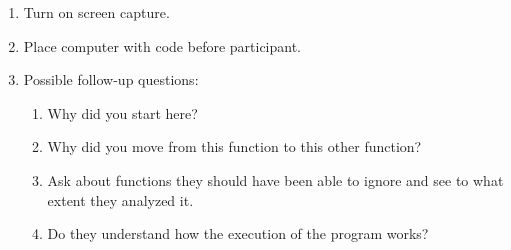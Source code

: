 \documentclass{article}
\begin{document}
\begin{enumerate}
\begin{enumerate}
    \item Turn on screen capture.
    \item Place computer with code before participant.
    \item Possible follow-up questions:
     \begin{enumerate}
      \item Why did you start here?
      \item Why did you move from this function to this other function?
      \item Ask about functions they should have been able to ignore and see to what extent they analyzed it.
      \item Do they understand how the execution of the program works?
    \end{enumerate}
  \end{enumerate}
  
\end{enumerate}
\end{document}
